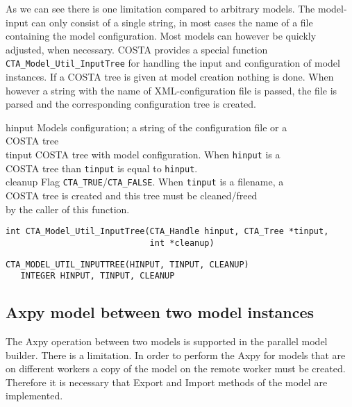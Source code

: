 As we can see there is one limitation compared to arbitrary models. The
model-input can only consist of a single string, in most cases the name of
a file containing the model configuration. Most models can however be quickly
adjusted, when necessary. COSTA provides a special function {\tt
CTA\_Model\_Util\_InputTree} for handling
the input and configuration of model instances. If a COSTA tree is given
at model creation nothing is done. When however a string with the name of
XML-configuration file is passed, the file is parsed and the corresponding
configuration tree is created.

\horzline
\begin{tabbing}
\functab
{}
  {hinput}  {Models configuration; a string of the
configuration file or a}\\
\funcline{}    {}        {COSTA tree}\\
 {tinput}  {COSTA tree with model configuration.
                          When {\tt hinput} is a }\\
\funcline{}    {}        {COSTA tree than {\tt tinput} is equal to
                          {\tt hinput}.}\\
 {cleanup}  {Flag {\tt CTA\_TRUE}/{\tt CTA\_FALSE}. When
{\tt tinput} is a filename, a }\\
\funcline{}    {}        {COSTA tree is created and this tree must be
cleaned/freed }\\
\funcline{}    {}        {by the caller of this function.}\\
\end{tabbing}
\horzline

\begin{verbatim}
int CTA_Model_Util_InputTree(CTA_Handle hinput, CTA_Tree *tinput,
                             int *cleanup)
\end{verbatim}

\begin{verbatim}
CTA_MODEL_UTIL_INPUTTREE(HINPUT, TINPUT, CLEANUP)
   INTEGER HINPUT, TINPUT, CLEANUP
\end{verbatim}

\subsection{Axpy model between two model instances}
The Axpy operation between two models is supported in the parallel model
builder. There is a limitation. In order to perform the Axpy for models
that are on different workers a copy of the model on the remote worker must
be created. Therefore it is necessary that Export and Import methods of the
model are implemented.

